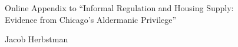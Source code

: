 \documentclass[12pt]{article}
\begin{document}
\begin{center}
{\Large Online Appendix to ``Informal Regulation and Housing Supply: \\
Evidence from Chicago's Aldermanic Privilege''}

\vspace{1em}
Jacob Herbstman
\end{center}

\appendix
{}



\clearpage


\clearpage

\end{document}

